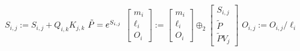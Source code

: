\documentclass{standalone}
\begin{document}
    \begin{varwidth}{\linewidth}


\begin{algorithmic}
  \ForAll{$i,j \in [0,N) \times [0,N)$}
    \For {$k \in [0,d)$}
      \State $S_{i,j} := S_{i,j} + Q_{i,k} K_{j,k}$
    \EndFor
  \EndFor
  \ForAll{$i \in [0,N)$}
    \For {$j \in [0,N)$}
      \State $\vphantom{A^{A^A}}\tilde{P} = e^{S_{i,j}}$
      \State $
        \begin{bmatrix} m_i \\ \ell_i \\ O_{i} \end{bmatrix}
        := 
        \begin{bmatrix} m_i \\ \ell_i \\ O_{i}\end{bmatrix} 
        \oplus_2 
        \begin{bmatrix} S_{i,j} \\ \tilde{P} \\ \tilde{P} V_{j} \end{bmatrix}
      $
    \EndFor
  \EndFor
  \ForAll{$i,j \in [0,N) \times [0,N)$}
    \State $O_{i,j} := O_{i,j} / \ell_i$
  \EndFor
\end{algorithmic}
    \end{varwidth}
\end{document}

